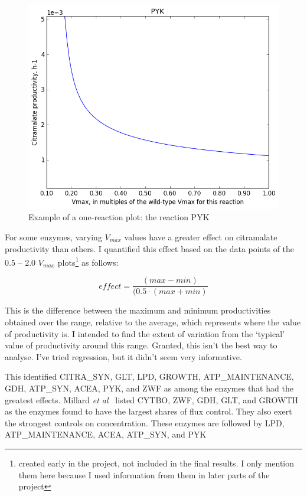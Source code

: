 \documentclass[parskip=full]{scrreprt}
\begin{document}
\begin{figure}[htbp]
  \centering
  \includegraphics[scale=0.5]{onereacsample}
  \caption{Example of a one-reaction plot: the reaction PYK}
  \label{fig:onereacsample}
\end{figure}

For some enzymes, varying $V_{max}$ values have a greater effect on citramalate productivity than others. I quantified this effect based on the data points of the 0.5 -- 2.0 $V_{max}$ plots\footnote{created early in the project, not included in the final results. I only mention them here because I used information from them in later parts of the project} as follows:

\[
effect = \frac{(max - min)}{(0.5 \cdot (max + min)}
\]

This is the difference between the maximum and minimum productivities obtained over the range, relative to the average, which represents where the value of productivity is. I intended to find the extent of variation from the `typical' value of productivity around this range. Granted, this isn’t the best way to analyse. I’ve tried regression, but it didn’t seem very informative.

This identified CITRA\_SYN, GLT, LPD, GROWTH, ATP\_MAINTENANCE, GDH, ATP\_SYN, ACEA, PYK, and ZWF as among the enzymes that had the greatest effects. Millard \emph{et al}~\cite{millard_metabolic_2017} listed CYTBO, ZWF, GDH, GLT, and GROWTH as the enzymes found to have the largest shares of flux control. They also exert the strongest controls on concentration. These enzymes are followed by LPD, ATP\_MAINTENANCE, ACEA, ATP\_SYN, and PYK
\end{document}
